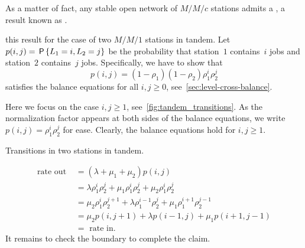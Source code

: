 \documentclass[stochastic-or.tex]{subfiles}
\begin{document}
As a matter of fact, any stable open network of $M/M/c$ stations
admits a , a result known as .

 this result for the case of two $M/M/1$ stations in tandem.
Let $p(i,j)=\,\mathsf{P}\left\{L_1=i, L_2=j\right\}$ be the probability that station~$1$ contains~$i$ jobs and station~$2$ contains~$j$ jobs.
Specifically, we have to show that
\begin{equation}
\label{eq:gers-1}
p(i,j) = (1-\rho_1)(1-\rho_2)\rho_1^i \rho_2^j
\end{equation}
satisfies the balance equations for all $i, j\geq 0$, see~\cref{sec:level-cross-balance}.


Here we focus on the case $i, j \geq 1$, see~\cref{fig:tandem_transitions}.
As the normalization factor appears at both sides of the balance equations, we write $p(i,j) = \rho_1^i \rho_2^j$ for ease.
Clearly, the balance equations hold for $i, j \geq 1$.
\begin{marginfigure}
 \caption{Transitions in  two stations in tandem.}
 \label{fig:tandem_transitions}
\end{marginfigure}
\begin{align*}
    \text{rate out } &=(\lambda + \mu_1 + \mu_2) p(i, j) \\
    &= \lambda  \rho_1^i \rho_2^j + \mu_1 \rho_1^{i} \rho_2^j + \mu_2 \rho_1^i\rho_2^j\\
    &=\mu_2 \rho_1^{i} \rho_2^{j+1} + \lambda \rho_1^{i-1} \rho_2^j + \mu_1 \rho_1^{i+1}\rho_2^{j-1}\\
                     &= \mu_2p(i, j+1) + \lambda p(i-1, j) + \mu_1 p(i+1, j-1)\\
    &= \text{ rate in}.
\end{align*}
It remains to check  the boundary to complete the claim.
\end{document}
